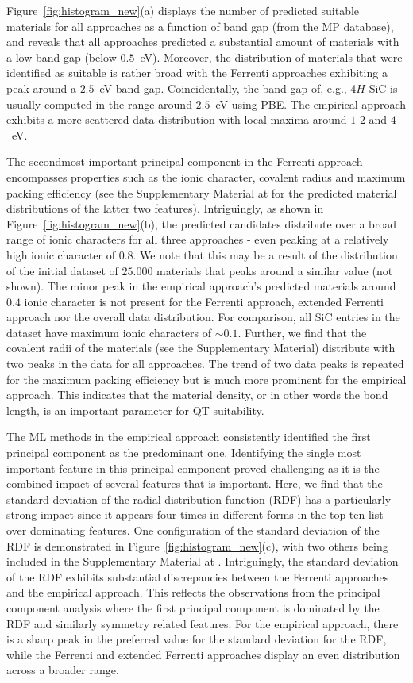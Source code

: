\documentclass[superscriptaddress,unsortedaddress,
 amsmath,amssymb,
 aps,
]{revtex4-2}
\begin{document}
Figure~\ref{fig:histogram_new}(a) displays the number of predicted suitable materials for all approaches as a function of band gap (from the MP database), and reveals that all approaches predicted a substantial amount of materials with a low band gap (below $0.5$~eV). Moreover, the distribution of materials that were identified as suitable is rather broad with the Ferrenti approaches exhibiting a peak around a $2.5$~eV band gap. 
Coincidentally, the band gap of, e.g., 4$H$-SiC is usually computed in the range around $2.5$~eV using PBE. 
The empirical approach exhibits a more scattered data distribution with local maxima around $1$-$2$ and $4$~eV. 

The secondmost important principal component in the Ferrenti approach encompasses properties such as the ionic character, covalent radius and maximum packing efficiency (see the Supplementary Material at \cite{supplementary} for the predicted material distributions of the latter two features).  
Intriguingly, as shown in Figure~\ref{fig:histogram_new}(b), the predicted candidates distribute over a broad range of ionic characters for all three approaches - even peaking at a relatively high ionic character of $0.8$. 
We note that this may be a result of the distribution of the initial dataset of $25.000$ materials that peaks around a similar value (not shown). The minor peak in the empirical approach's predicted materials around $0.4$ ionic character is not present for the Ferrenti approach, extended Ferrenti approach nor the overall data distribution. For comparison, all SiC entries in the dataset have maximum ionic characters of $\sim 0.1$. 
Further, we find that the covalent radii of the materials (see the Supplementary Material) distribute with two peaks in the data for all approaches. 
The trend of two data peaks is repeated for the maximum packing efficiency but is much more prominent for the empirical approach. This indicates that the material density, or in other words the bond length, is an important parameter for QT suitability.  

The ML methods in the empirical approach consistently identified the first principal component as the predominant one. Identifying the single most important feature in this principal component proved challenging as it is the combined impact of several features that is important. 
Here, we find that the standard deviation of the radial distribution function (RDF) has a  particularly strong impact since it appears four times in different forms in the top ten list over dominating features. One configuration of the standard deviation of the RDF is demonstrated in Figure~\ref{fig:histogram_new}(c), with two others being included in the Supplementary Material at \cite{supplementary}. Intriguingly, the standard deviation of the RDF exhibits substantial discrepancies between the Ferrenti approaches and the empirical approach. This reflects the observations from the principal component analysis where the first principal component is dominated by the RDF and similarly symmetry related features. For the empirical approach, there is a sharp peak in the preferred value for the standard deviation for the RDF, while the Ferrenti and extended Ferrenti approaches display an even distribution across a broader range. 
\end{document}
